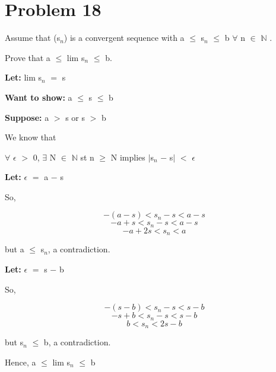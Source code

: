 \documentclass{article}
\newcommand{\mt}[1]{\ensuremath{#1}}
\newcommand\bsc[2][\DefaultOpt]{%
  \def\DefaultOpt{#2}%
  \section[#1]{#2}%
}
\newcommand{\lt}[1]{\textbf{Let: } #1}
\newcommand{\supp}[1]{\textbf{Suppose: } #1}
\newcommand{\wts}[1]{\textbf{Want to show: } #1}
\newcommand{\bn}{\mt{\mathbb{N}} }       %
\newcommand{\ep}{\mt{\epsilon} }         %
\newcommand{\fa}{\mt{\forall} }          %
\newcommand{\mem}{\mt{\in} }
\newcommand{\exs}{\mt{\exists} }
\newcommand{\av}[1]{\mt{|}#1\mt{|}}  %
\newcommand{\prn}[1]{(#1)}
\newcommand{\ms}{\mt{-} }
\newcommand{\ls}{\mt{<} }
\newcommand{\gr}{\mt{>} }
\newcommand{\lse}{\mt{\leq} }
\newcommand{\gre}{\mt{\geq} }
\newcommand{\eql}{\mt{=} }
\newcommand{\uw}[2]{#1\mt{_{#2}}}
\newcommand{\eqn}[1]{\[#1\]}
\begin{document}
\bsc{Problem 18}{
Assume that \prn{\uw{s}{n}} is a convergent sequence with a \lse \uw{s}{n} \lse b \fa n \mem \bn.

Prove that a \lse lim \uw{s}{n} \lse b.

\lt{lim \uw{s}{n} \eql s}

\wts{a \lse s \lse b}

\supp{a \gr s or s \gr b}

We know that 

\fa \ep \gr 0, \exs N \mem \bn st n \gre N implies \av{\uw{s}{n} \ms s} \ls \ep

\lt{\ep \eql a \ms s}

So,

\eqn{-(a - s) \ls \uw{s}{n} - s \ls a - s}
\eqn{-a + s \ls \uw{s}{n} - s \ls a - s }
\eqn{-a + 2s \ls \uw{s}{n} \ls a}

but a \lse \uw{s}{n}, a contradiction.

\lt{\ep \eql s \ms b}

So,

\eqn{-(s - b) \ls \uw{s}{n} - s \ls s - b}
\eqn{-s + b \ls \uw{s}{n} - s \ls s - b}
\eqn{b \ls \uw{s}{n} \ls 2s - b}

but \uw{s}{n} \lse b, a contradiction.

Hence, a \lse lim \uw{s}{n} \lse b

}
\end{document}
